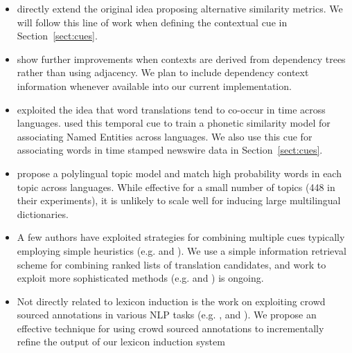 \documentclass{article}
\newcommand{\mtodo}[1]{}
\newcommand{\secref}[1]{Section~\ref{#1}}
\begin{document}
\begin{itemize}
\setlength{\parskip}{0pt}
  \item \cite{Rapp:1999,Fung:1998} directly extend the original idea proposing alternative similarity metrics.  We will follow this line of work when defining the contextual cue in \secref{sect:cues}.
  \item \cite{Garera:2009} show further improvements when contexts are derived from dependency trees rather than using adjacency.  We plan to include dependency context information whenever available into our current implementation.  
  \item \cite{Schafer:2002} exploited the idea that word translations tend to co-occur in time across languages. \cite{Klementiev:2006b} used this temporal cue to train a phonetic similarity model for associating Named Entities across languages.  We also use this cue for associating words in time stamped newswire data in \secref{sect:cues}.
  \item \cite{Mimno:2009} propose a polylingual topic model and match high probability words in each topic across languages.  While effective for a small number of topics (448 in their experiments), it is unlikely to scale well for inducing large multilingual dictionaries.  %
  \item A few authors have exploited strategies for combining multiple cues typically employing simple heuristics (e.g. \cite{Schafer:2002} and \cite{Koehn:2002}).  We use a simple information retrieval scheme for combining ranked lists of translation candidates, and work to exploit more sophisticated methods (e.g. \cite{Klementiev:2006b} and \cite{Klementiev:2008a}) is ongoing.
  \item Not directly related to lexicon induction is the work on exploiting crowd sourced annotations in various NLP tasks (e.g. \cite{Snow:2008}, and \cite{CCB:2009}).  We  propose an effective technique for using crowd sourced annotations to incrementally refine the output of our lexicon induction system
\end{itemize}  \mtodo{A few words about the scalability of Haghighli's model.}
\end{document}
